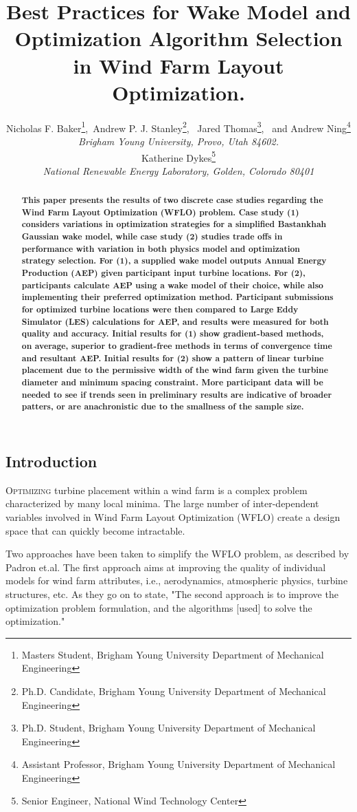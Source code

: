 \documentclass[]{aiaa-tc}
\title{Best Practices for Wake Model and Optimization Algorithm Selection in Wind Farm Layout Optimization.}
\author{Nicholas F. Baker\thanks{Masters Student, Brigham Young University Department of Mechanical Engineering},\  Andrew P. J. Stanley\thanks{Ph.D. Candidate, Brigham Young University Department of Mechanical Engineering}, \ Jared Thomas\thanks{Ph.D. Student, Brigham Young University Department of Mechanical Engineering}, \ and Andrew Ning\thanks{Assistant Professor, Brigham Young University Department of Mechanical Engineering} \\
    {\normalsize\itshape Brigham Young University, Provo, Utah 84602.}\\
Katherine Dykes\thanks{Senior Engineer, National Wind Technology Center}\\
   \normalsize\itshape National Renewable Energy Laboratory, Golden, Colorado 80401}
\begin{document}
\maketitle{}
\begin{abstract}
	\textbf{This paper presents the results of two discrete case studies regarding the Wind Farm Layout Optimization (WFLO) problem. Case study (1) considers variations in optimization strategies for a simplified Bastankhah Gaussian wake model, while case study (2) studies trade offs in performance with variation in both physics model and optimization strategy selection. For (1), a supplied wake model outputs Annual Energy Production (AEP) given participant input turbine locations. For (2), participants calculate AEP using a wake model of their choice, while also implementing their preferred optimization method. Participant submissions for optimized turbine locations were then compared to Large Eddy Simulator (LES) calculations for AEP, and results were measured for both quality and accuracy. Initial results for (1) show gradient-based methods, on average, superior to gradient-free methods in terms of convergence time and resultant AEP. Initial results for (2) show a pattern of linear turbine placement due to the permissive width of the wind farm given the turbine diameter and minimum spacing constraint. More participant data will be needed to see if trends seen in preliminary results are indicative of broader patters, or are anachronistic due to the smallness of the sample size.}
\end{abstract}

\begin{centering}
	\section{Introduction}
\end{centering}

\lettrine[nindent=0pt]{O}{ptimizing} turbine placement within a wind farm is a complex problem characterized by many local minima. The large number of inter-dependent variables involved in Wind Farm Layout Optimization (WFLO) create a design space that can quickly become intractable.

Two approaches have been taken to simplify the WFLO problem, as described by Padron et.al.\cite{Padron2018} The first approach aims at improving the quality of individual models for wind farm attributes, i.e., aerodynamics, atmospheric physics, turbine structures, etc. As they go on to state, "The second approach is to improve the optimization problem formulation, and the algorithms [used] to solve the optimization." \cite{Padron2018}
\end{document}

